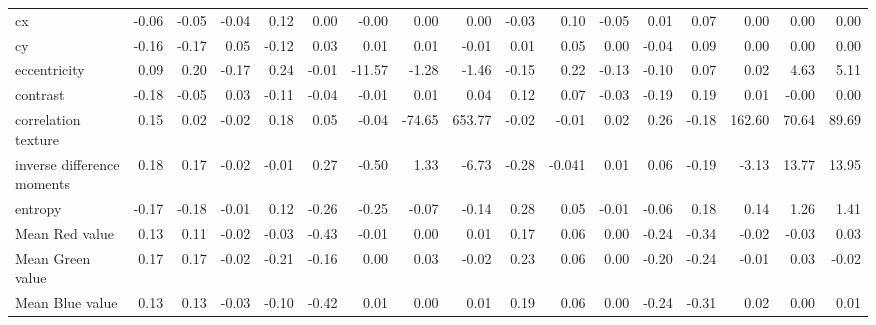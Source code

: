 \documentclass{article}
\begin{document}
\begin{table}[!ht]
{\begin{tabular}{lrrrrrrrrrrrrrrrr}
cx                                                                          & -0.06 & -0.05 & -0.04 & 0.12  & 0.00 & -0.00   & 0.00   & 0.00     & -0.03 & 0.10  & -0.05 & 0.01  & 0.07  & 0.00   & 0.00   & 0.00    \\
cy                                                                          & -0.16 & -0.17 & 0.05  & -0.12 & 0.03  & 0.01     & 0.01     & -0.01     & 0.01  & 0.05  & 0.00  & -0.04 & 0.09  & 0.00   & 0.00    & 0.00    \\
eccentricity                                                                & 0.09  & 0.20  & -0.17 & 0.24  & -0.01 & -11.57      & -1.28      & -1.46       & -0.15 & 0.22  & -0.13 & -0.10 & 0.07  & 0.02     & 4.63       & 5.11       \\
contrast                                                                    & -0.18 & -0.05 & 0.03  & -0.11 & -0.04 & -0.01    & 0.01    & 0.04      & 0.12  & 0.07  & -0.03 & -0.19 & 0.19  & 0.01    & -0.00   & 0.00    \\
correlation texture                                                         & 0.15  & 0.02  & -0.02 & 0.18  & 0.05  & -0.04    & -74.65      & 653.77        & -0.02 & -0.01 & 0.02  & 0.26  & -0.18 & 162.60       & 70.64       & 89.69       \\
inverse difference moments                                                  & 0.18  & 0.17  & -0.02 & -0.01 & 0.27  & -0.50     & 1.33       & -6.73       & -0.28 & -0.041 & 0.01  & 0.06  & -0.19 & -3.13      & 13.77       & 13.95        \\
entropy                                                                     & -0.17 & -0.18 & -0.01 & 0.12  & -0.26 & -0.25     & -0.07    & -0.14      & 0.28  & 0.05  & -0.01 & -0.06 & 0.18  & 0.14      & 1.26       & 1.41        \\
Mean Red value                                                              & 0.13  & 0.11  & -0.02 & -0.03 & -0.43 & -0.01  & 0.00   & 0.01     & 0.17  & 0.06  & 0.00 & -0.24 & -0.34 & -0.02    & -0.03    & 0.03      \\
Mean Green value                                                             & 0.17  & 0.17  & -0.02 & -0.21 & -0.16 & 0.00  & 0.03     & -0.02     & 0.23  & 0.06  & 0.00 & -0.20 & -0.24 & -0.01   & 0.03     & -0.02     \\
Mean Blue value                                                             & 0.13  & 0.13  & -0.03 & -0.10 & -0.42 & 0.01   & 0.00   & 0.01     & 0.19  & 0.06  & 0.00 & -0.24 & -0.31 & 0.02     & 0.00    & 0.01     \\

\end{tabular}}
\end{table}
\end{document}
